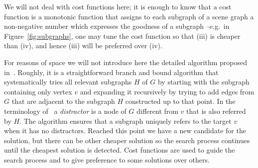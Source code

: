 We will not deal with cost functions here; it is enough to know
that a cost function is a monotonic function that assigns to each
subgraph of a scene graph a non-negative number which expresses the
goodness of a subgraph --e.g.\ in Figure~\ref{fig:subgraphs}, one
may tune the cost function so that (iii) is cheaper than (iv), and hence
(iii) will be preferred over (iv).

For reasons of space we will not introduce here the detailed algorithm proposed
in~\cite{Krahmer2003}. Roughly, it is a
straightforward branch and bound algorithm that systematically tries all
relevant subgraphs $H$ of $G$ by starting with the subgraph
containing only vertex $v$ and expanding it recursively by trying to
add edges from $G$ that are adjacent to the subgraph $H$ constructed
up to that point. In the terminology
of~\cite{Krahmer2003} a {\em distractor} is a node of $G$ different from
$v$ that is also referred by $H$.
The algorithm ensures that a subgraph uniquely refers to the
target $v$ when it has no distractors. Reached this point we
have a new candidate for the solution, but there can be other
cheaper solution so the search process continues until the
cheapest solution is detected. Cost functions are used to
guide the search process and to give preference to some solutions
over others.
%

